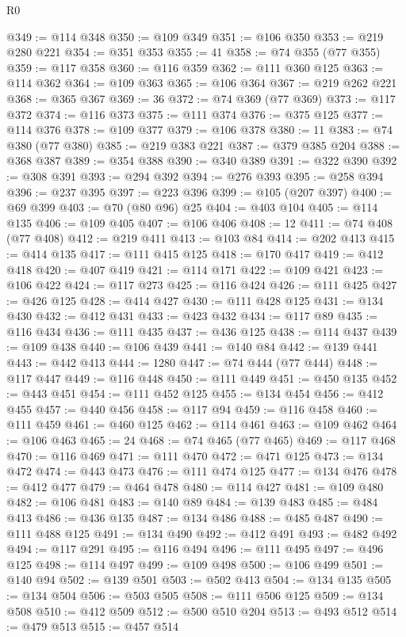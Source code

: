 \begin{lexlean}{R0}
\begin{coremodule}
@349 := @114 @348
@350 := @109 @349
@351 := @106 @350
@353 := @219 @280 @221
@354 := @351 @353
@355 := 41
@358 := @74 @355 (@77 @355)
@359 := @117 @358
@360 := @116 @359
@362 := @111 @360 @125
@363 := @114 @362
@364 := @109 @363
@365 := @106 @364
@367 := @219 @262 @221
@368 := @365 @367
@369 := 36
@372 := @74 @369 (@77 @369)
@373 := @117 @372
@374 := @116 @373
@375 := @111 @374
@376 := @375 @125
@377 := @114 @376
@378 := @109 @377
@379 := @106 @378
@380 := 11
@383 := @74 @380 (@77 @380)
@385 := @219 @383 @221
@387 := @379 @385 @204
@388 := @368 @387
@389 := @354 @388
@390 := @340 @389
@391 := @322 @390
@392 := @308 @391
@393 := @294 @392
@394 := @276 @393
@395 := @258 @394
@396 := @237 @395
@397 := @223 @396
@399 := @105 (@207 @397)
@400 := @69 @399
@403 := @70 (@80 @96) @25
@404 := @403 @104
@405 := @114 @135
@406 := @109 @405
@407 := @106 @406
@408 := 12
@411 := @74 @408 (@77 @408)
@412 := @219 @411
@413 := @103 @84
@414 := @202 @413
@415 := @414 @135
@417 := @111 @415 @125
@418 := @170 @417
@419 := @412 @418
@420 := @407 @419
@421 := @114 @171
@422 := @109 @421
@423 := @106 @422
@424 := @117 @273
@425 := @116 @424
@426 := @111 @425
@427 := @426 @125
@428 := @414 @427
@430 := @111 @428 @125
@431 := @134 @430
@432 := @412 @431
@433 := @423 @432
@434 := @117 @89
@435 := @116 @434
@436 := @111 @435
@437 := @436 @125
@438 := @114 @437
@439 := @109 @438
@440 := @106 @439
@441 := @140 @84
@442 := @139 @441
@443 := @442 @413
@444 := 1280
@447 := @74 @444 (@77 @444)
@448 := @117 @447
@449 := @116 @448
@450 := @111 @449
@451 := @450 @135
@452 := @443 @451
@454 := @111 @452 @125
@455 := @134 @454
@456 := @412 @455
@457 := @440 @456
@458 := @117 @94
@459 := @116 @458
@460 := @111 @459
@461 := @460 @125
@462 := @114 @461
@463 := @109 @462
@464 := @106 @463
@465 := 24
@468 := @74 @465 (@77 @465)
@469 := @117 @468
@470 := @116 @469
@471 := @111 @470
@472 := @471 @125
@473 := @134 @472
@474 := @443 @473
@476 := @111 @474 @125
@477 := @134 @476
@478 := @412 @477
@479 := @464 @478
@480 := @114 @427
@481 := @109 @480
@482 := @106 @481
@483 := @140 @89
@484 := @139 @483
@485 := @484 @413
@486 := @436 @135
@487 := @134 @486
@488 := @485 @487
@490 := @111 @488 @125
@491 := @134 @490
@492 := @412 @491
@493 := @482 @492
@494 := @117 @291
@495 := @116 @494
@496 := @111 @495
@497 := @496 @125
@498 := @114 @497
@499 := @109 @498
@500 := @106 @499
@501 := @140 @94
@502 := @139 @501
@503 := @502 @413
@504 := @134 @135
@505 := @134 @504
@506 := @503 @505
@508 := @111 @506 @125
@509 := @134 @508
@510 := @412 @509
@512 := @500 @510 @204
@513 := @493 @512
@514 := @479 @513
@515 := @457 @514

\end{coremodule}
\end{lexlean}
